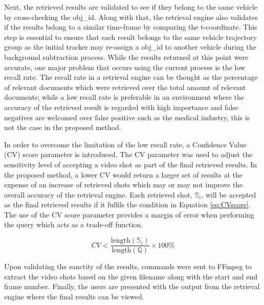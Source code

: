 Next, the retrieved results are validated to see if they belong to the same vehicle by cross-checking the obj\_id. Along with that, the retrieval engine also validates if the results belong to a similar time-frame by comparing the t-coordinate. This step is essential to ensure that each result belongs to the same vehicle trajectory group as the initial tracker may re-assign a obj\_id to another vehicle during the background subtraction process.
While the results returned at this point were accurate, one major problem that occurs using the current process is the low recall rate. The recall rate in a retrieval engine can be thought as the percentage of relevant documents which were retrieved over the total amount of relevant documents; while a low recall rate is preferable in an environment where the accuracy of the retrieved result is regarded with high importance and false negatives are welcomed over false positive such as the medical industry, this is not the case in the proposed method.

In order to overcome the limitation of the low recall rate, a Confidence Value (CV) score parameter is introduced. The CV parameter was used to adjust the sensitivity level of accepting a video shot as part of the final retrieved results. In the proposed method, a lower CV would return a larger set of results at the expense of an increase of retrieved shots which may or may not improve the overall accuracy of the retrieval engine. Each retrieved shot, $\mathbb{S}_i$, will be accepted as the final retrieved results if it fulfils the condition in Equation \ref{eq:CVscore}. The use of the CV score parameter provides a margin of error when performing the query which acts as a trade-off function.

\begin{equation}
\label{eq:CVscore}
CV < \frac{\text{length}(\mathbb{S}_i)}{\text{length}(\mathbb{Q})} \times 100\%
\end{equation}



Upon validating the sanctity of the results, commands were sent to FFmpeg to extract the video shots based on the given filename along with the start and end frame number. Finally, the users are presented with the output from the retrieval engine where the final results can be viewed.


